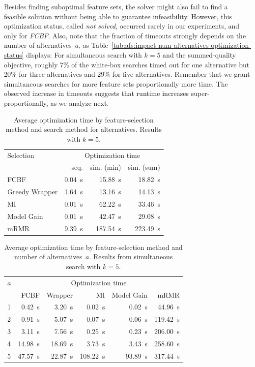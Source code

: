 \documentclass{article}
\theoremstyle{definition}
\begin{document}
Besides finding suboptimal feature sets, the solver might also fail to find a feasible solution without being able to guarantee infeasibility.
However, this optimization status, called \emph{not solved}, occurred rarely in our experiments, and only for \emph{FCBF}.
Also, note that the fraction of timeouts strongly depends on the number of alternatives~$a$, as Table~\ref{tab:afs:impact-num-alternatives-optimization-status} displays:
For simultaneous search with $k=5$ and the summed-quality objective, roughly 7\% of the white-box searches timed out for one alternative but 20\% for three alternatives and 29\% for five alternatives.
Remember that we grant simultaneous searches for more feature sets proportionally more time.
The observed increase in timeouts suggests that runtime increases super-proportionally, as we analyze next.

\begin{table}[htb]
	\centering
	\begin{tabular}{lrrr}
		\toprule
		Selection & \multicolumn{3}{c}{Optimization time} \\
		\cmidrule(r){2-4}
		& seq. & sim. (min) & sim. (sum) \\
		\midrule
		FCBF & 0.04~s & 15.88~s & 18.82~s \\
		Greedy Wrapper & 1.64~s & 13.16~s & 14.13~s \\
		MI & 0.01~s & 62.22~s & 33.46~s \\
		Model Gain & 0.01~s & 42.47~s & 29.08~s \\
		mRMR & 9.39~s & 187.54~s & 223.49~s \\
		\bottomrule
	\end{tabular}
	\caption{
		Average optimization time by feature-selection method and search method for alternatives.
		Results with $k=5$.
	}
	\label{tab:afs:impact-search-fs-method-optimization-time}
\end{table}
%
\begin{table}[htb]
	\centering
	\begin{tabular}{lrrrrr}
		\toprule
		$a$ & \multicolumn{5}{c}{Optimization time} \\
		\cmidrule(r){2-6}
		& FCBF & Wrapper & MI & Model Gain & mRMR \\
		\midrule
		1 & 0.42~s & 3.20~s & 0.02~s & 0.02~s & 44.96~s \\
		2 & 0.91~s & 5.07~s & 0.07~s & 0.06~s & 119.42~s \\
		3 & 3.11~s & 7.56~s & 0.25~s & 0.23~s & 206.00~s \\
		4 & 14.98~s & 18.69~s & 3.73~s & 3.43~s & 258.60~s \\
		5 & 47.57~s & 22.87~s & 108.22~s & 93.89~s & 317.44~s \\
		\bottomrule
	\end{tabular}
	\caption{
		Average optimization time by feature-selection method and number of alternatives~$a$.
		Results from simultaneous search with $k=5$.
	}
	\label{tab:afs:impact-num-alternatives-fs-method-optimization-time}
\end{table}
\end{document}
